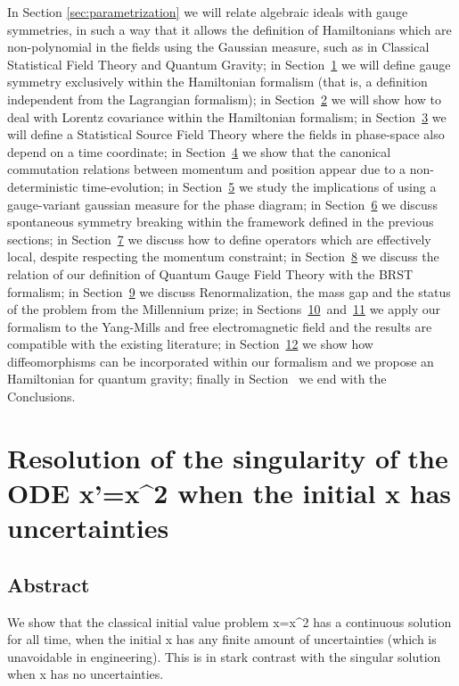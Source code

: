 \documentclass[11pt]{book}
\begin{document}
In Section
\protect\hyperlink{sec:parametrization}{{[}sec:parametrization{]}} we
will relate algebraic ideals with gauge symmetries, in such a way that
it allows the definition of Hamiltonians which are non-polynomial in the
fields using the Gaussian measure, such as in Classical Statistical
Field Theory and Quantum Gravity; in
Section~\protect\hyperlink{sec:gauge}{1} we will define gauge symmetry
exclusively within the Hamiltonian formalism (that is, a definition
independent from the Lagrangian formalism); in
Section~\protect\hyperlink{sec:lorentz}{2} we will show how to deal with
Lorentz covariance within the Hamiltonian formalism; in
Section~\protect\hyperlink{sec:source}{3} we will define a Statistical
Source Field Theory where the fields in phase-space also depend on a
time coordinate; in Section~\protect\hyperlink{sec:time}{4} we show that
the canonical commutation relations between momentum and position appear
due to a non-deterministic time-evolution; in
Section~\protect\hyperlink{sec:gaussian}{5} we study the implications of
using a gauge-variant gaussian measure for the phase diagram; in
Section~\protect\hyperlink{sec:spontaneous}{6} we discuss spontaneous
symmetry breaking within the framework defined in the previous sections;
in Section~\protect\hyperlink{sec:local}{7} we discuss how to define
operators which are effectively local, despite respecting the momentum
constraint; in Section~\protect\hyperlink{sec:brst}{8} we discuss the
relation of our definition of Quantum Gauge Field Theory with the BRST
formalism; in Section~\protect\hyperlink{sec:rg}{9} we discuss
Renormalization, the mass gap and the status of the problem from the
Millennium prize; in
Sections~\protect\hyperlink{sec:ym}{10}~and~\protect\hyperlink{sec:em}{11}
we apply our formalism to the Yang-Mills and free electromagnetic field
and the results are compatible with the existing literature; in
Section~\protect\hyperlink{sec:gravity}{12} we show how diffeomorphisms
can be incorporated within our formalism and we propose an Hamiltonian
for quantum gravity; finally in Section~ we end with the Conclusions.

\chapter{Resolution of the singularity of the ODE x'=x\^{}2 when the initial x has uncertainties}
\section*{Abstract}
We show that the classical initial value problem
x\textquotesingle=x\^{}2 has a continuous solution for all time, when
the initial x has any finite amount of uncertainties (which is
unavoidable in engineering). This is in stark contrast with the singular
solution when x has no uncertainties.
\end{document}
